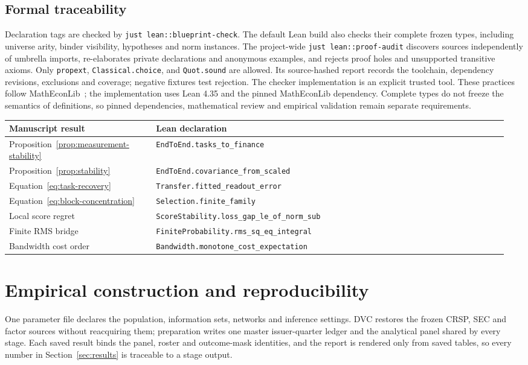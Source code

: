 \documentclass[11pt]{article}
\begin{document}
\subsection{Formal traceability}\label{app:traceability}
Declaration tags are checked by \texttt{just lean::blueprint-check}. The default
Lean build also checks their complete frozen types, including universe arity,
binder visibility, hypotheses and norm instances. The project-wide
\texttt{just lean::proof-audit} discovers sources independently of
umbrella imports,
re-elaborates private declarations and anonymous examples, and rejects proof
holes and unsupported transitive axioms. Only \texttt{propext},
\texttt{Classical.choice}, and \texttt{Quot.sound} are allowed. Its
source-hashed
report records the toolchain, dependency revisions, exclusions and coverage;
negative fixtures test rejection. The checker implementation is an explicit
trusted tool. These practices follow MathEconLib~\cite{matheconlib2026}; the
implementation uses Lean 4.35 and the pinned MathEconLib dependency.
Complete types do not freeze the
semantics of definitions, so pinned dependencies, mathematical review and
empirical validation remain separate requirements.
\begin{center}\small
  \begin{tabular}{@{}p{0.29\linewidth}p{0.67\linewidth}@{}}
    \toprule
    Manuscript result & Lean declaration\\
    \midrule
    Proposition~\ref{prop:measurement-stability} &
    \texttt{EndToEnd.tasks\_to\_finance}\\
    Proposition~\ref{prop:stability} &
    \texttt{EndToEnd.covariance\_from\_scaled}\\
    Equation~\eqref{eq:task-recovery} &
    \texttt{Transfer.fitted\_readout\_error}\\
    Equation~\eqref{eq:block-concentration} &
    \texttt{Selection.finite\_family}\\
    Local score regret & \texttt{ScoreStability.loss\_gap\_le\_of\_norm\_sub}\\
    Finite RMS bridge & \texttt{FiniteProbability.rms\_sq\_eq\_integral}\\
    Bandwidth cost order & \texttt{Bandwidth.monotone\_cost\_expectation}\\
    \bottomrule
  \end{tabular}
\end{center}

\section{Empirical construction and
reproducibility}\label{sec:empirical-supplement}
One parameter file declares the population, information sets, networks and
inference settings. DVC restores the frozen CRSP, SEC and factor sources without
reacquiring them; preparation writes one master issuer-quarter ledger and the
analytical panel shared by every stage. Each saved result binds the
panel, roster
and outcome-mask identities, and the report is rendered only from
saved tables, so
every number in Section~\ref{sec:results} is traceable to a stage output.
\end{document}
